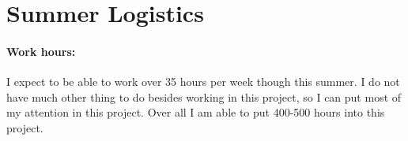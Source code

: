 \documentclass[a4paper,12pt,onecolumn]{article}
\begin{document}
\section{Summer Logistics} %
\label{sec:summer_logistics}

\paragraph{Work hours:} I expect to be able to work over 35 hours per week though this summer.
I do not have much other thing to do besides working in this project, so I can put most of my
attention in this project. Over all I am able to put 400-500 hours into this project.




\end{document}
